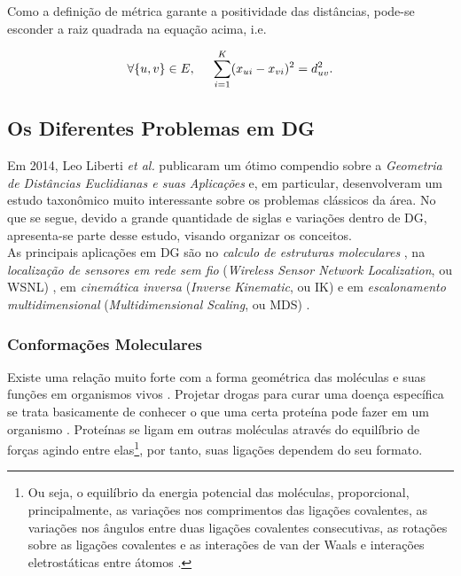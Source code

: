 Como a definição de métrica garante a positividade das distâncias, pode-se esconder a raiz quadrada na equação acima, i.e.

\begin{equation}
\forall \{u,v\} \in E, \hspace{0.5cm} \sum_{i=1}^{K}(x_{ui} - x_{vi})^2 = d_{uv}^2.
\label{eq:DGPSistemaQuadratico}
\end{equation}

\subsection{Os Diferentes Problemas em DG}

Em 2014, Leo Liberti \textit{et al.} publicaram um ótimo compendio sobre a \textit{Geometria de Distâncias Euclidianas e suas Aplicações} \cite{carlileGDandAplications} e, em particular, desenvolveram um estudo  taxonômico muito interessante sobre os problemas clássicos da área. No que se segue, devido a grande quantidade de siglas e variações dentro de DG, apresenta-se parte desse estudo, visando organizar os conceitos. 
\\

As principais aplicações em DG são no \textit{calculo de estruturas moleculares} \cite{crippen:DistancesAndMolecularConformation}, na \textit{localização de sensores em rede sem fio} (\textit{Wireless Sensor Network Localization}, ou WSNL) \cite{yemini1978positioning}, em \textit{cinemática inversa} (\textit{Inverse Kinematic}, ou IK) \cite{cinematicaInversa} e em \textit{escalonamento multidimensional} (\textit{Multidimensional Scaling}, ou MDS) \cite{multidimensionalScaling}.

\subsubsection{Conformações Moleculares}

Existe uma relação muito forte com a forma geométrica das moléculas e suas funções em organismos vivos \cite{bioquimicaLehninger}. Projetar drogas para curar uma doença específica se trata basicamente de conhecer o que uma certa proteína pode fazer em um organismo \cite{libertiEDG}. Proteínas se ligam em outras moléculas através do equilíbrio de forças agindo entre elas\footnote{Ou seja, o equilíbrio da energia potencial das moléculas, proporcional, principalmente, as variações nos comprimentos das ligações covalentes, as variações nos ângulos entre duas ligações covalentes consecutivas, as rotações sobre as ligações covalentes e as interações de van der Waals e interações eletrostáticas entre átomos \cite{carlileTese}.}, por tanto, suas ligações dependem do seu formato. 

